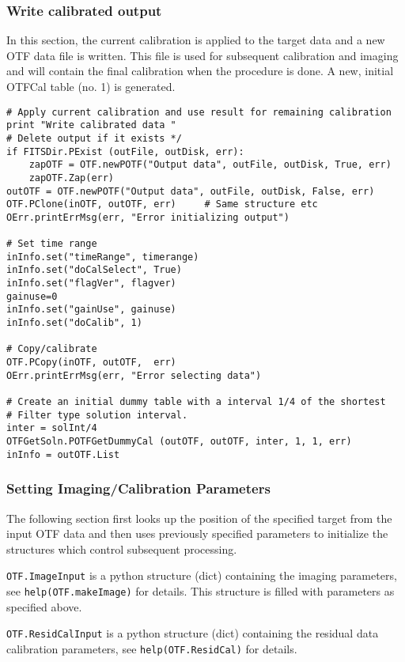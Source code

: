 \documentclass[11pt]{report}
\begin{document}
\subsubsection{Write calibrated output}
In this section, the current calibration is applied to the target data
and a new OTF data file is written.
This file is used for subsequent calibration and imaging and will
contain the final calibration when the procedure is done.
A new, initial OTFCal table (no. 1) is generated.
\begin{verbatim}
# Apply current calibration and use result for remaining calibration
print "Write calibrated data "
# Delete output if it exists */
if FITSDir.PExist (outFile, outDisk, err):
    zapOTF = OTF.newPOTF("Output data", outFile, outDisk, True, err)
    zapOTF.Zap(err)
outOTF = OTF.newPOTF("Output data", outFile, outDisk, False, err)
OTF.PClone(inOTF, outOTF, err)     # Same structure etc
OErr.printErrMsg(err, "Error initializing output")

# Set time range
inInfo.set("timeRange", timerange)
inInfo.set("doCalSelect", True)
inInfo.set("flagVer", flagver)
gainuse=0
inInfo.set("gainUse", gainuse)
inInfo.set("doCalib", 1)
 
# Copy/calibrate
OTF.PCopy(inOTF, outOTF,  err)
OErr.printErrMsg(err, "Error selecting data")

# Create an initial dummy table with a interval 1/4 of the shortest
# Filter type solution interval.
inter = solInt/4
OTFGetSoln.POTFGetDummyCal (outOTF, outOTF, inter, 1, 1, err)
inInfo = outOTF.List

\end{verbatim}


\subsubsection{Setting Imaging/Calibration Parameters}
The following section first looks up the position of the specified
target from the input OTF data and then uses previously specified
parameters to initialize the structures which control subsequent
processing. 

{\tt OTF.ImageInput} is a python structure (dict) containing the
imaging parameters, \\
see {\tt help(OTF.makeImage)} for details.
This structure is filled with parameters as specified above.

{\tt OTF.ResidCalInput} is a python structure (dict) containing the
residual data calibration parameters, see {\tt help(OTF.ResidCal)} for
details. 
\end{document}
